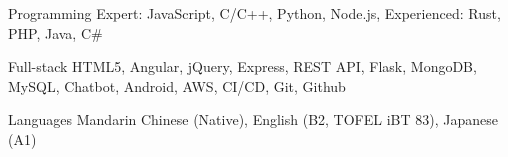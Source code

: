 
\begin{cvskills}
    \cvskill
    {Programming} %
    {Expert: JavaScript, C/C++, Python, Node.js, Experienced: Rust, PHP, Java, C\#} %

      \cvskill
        {Full-stack} %
        {HTML5, Angular, jQuery, Express, REST API, Flask, MongoDB, MySQL, Chatbot, Android, AWS, CI/CD, Git, Github} %

      \cvskill
        {Languages} %
        {Mandarin Chinese (Native), English (B2, TOFEL iBT 83), Japanese (A1)} %
    
\end{cvskills}
